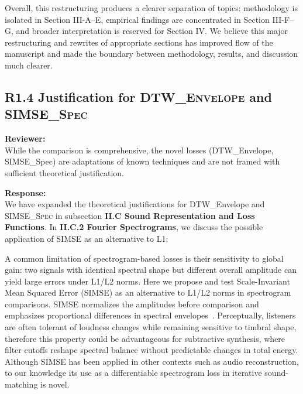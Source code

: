 \documentclass[11pt]{article}
\newcommand{\DTWEnv}{\textsc{DTW\_Envelope}}
\newcommand{\SIMSESpec}{\textsc{SIMSE\_Spec}}
\begin{document}
Overall, this restructuring produces a clearer separation of topics: methodology is isolated in Section III-A–E, empirical findings are concentrated in Section III-F–G, and broader interpretation is reserved for Section IV. We believe this major restructuring and rewrites of appropriate sections has improved flow of the manuscript and made the boundary between methodology, results, and discussion much clearer.

\subsection*{R1.4 Justification for \DTWEnv{} and \SIMSESpec}
\label{R1.4}
\noindent\textbf{Reviewer:} \\
\noindent While the comparison is comprehensive, the novel losses (DTW\_Envelope, SIMSE\_Spec) are adaptations of known techniques and are not framed with sufficient theoretical justification. 

\noindent\textbf{Response:} \\
We have expanded the theoretical justifications for DTW\_Envelope and \SIMSESpec{} in subsection \textbf{II.C Sound Representation and Loss Functions}. In \textbf{II.C.2 Fourier Spectrograms}, we discuss the possible application of SIMSE as an alternative to L1:
\begin{displayquote}
    A common limitation of spectrogram-based losses is their sensitivity to global gain: two signals with identical spectral shape but different overall amplitude can yield large errors under L1/L2 norms. 
    Here we propose and test Scale-Invariant Mean Squared Error (SIMSE) as an alternative to L1/L2 norms in spectrogram comparisons. SIMSE normalizes the amplitudes before comparison and emphasizes proportional differences in spectral envelopes~\cite{barron2014shapessimse}. 
    Perceptually, listeners are often tolerant of loudness changes while remaining sensitive to timbral shape, therefore this property could be advantageous for subtractive synthesis, where filter cutoffs reshape spectral balance without predictable changes in total energy. Although SIMSE has been applied in other contexts such as audio reconstruction, to our knowledge its use as a differentiable spectrogram loss in iterative sound-matching is novel.
\end{displayquote}
\end{document}
